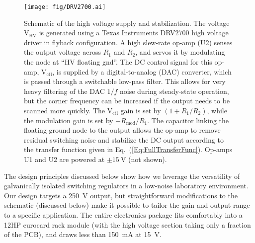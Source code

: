 \documentclass[aip,rsi,reprint]{revtex4-1} %
\begin{document}
\begin{figure}[t]
\texttt{[image: fig/DRV2700.ai]}
\caption{Schematic of the high voltage supply and stabilization.
The voltage $\text{V}_\text{HV}$ is generated using a Texas Instruments DRV2700 high voltage driver in flyback configuration.
A high slew-rate op-amp (U2) senses the output voltage across $R_1$ and $R_2$, and servos it by modulating the node at ``HV floating gnd''.
The DC control signal for this op-amp,  $\text{V}_{\text{ctl}}$, is supplied by a digital-to-analog (DAC) converter, which is passed through a switchable low-pass filter. This allows for very heavy filtering of the DAC $1/f$ noise during steady-state operation, but the corner frequency can be increased if the output needs to be scanned more quickly.
The $\text{V}_{\text{ctl}}$ gain is set by $\left(1+R_1/R_2\right)$, while the modulation gain is set by $-R_{\text{mod}}/R_1$.
The capacitor linking the floating ground node to the output allows the op-amp to remove residual switching noise and stabilize the DC output according to the transfer function given in Eq.~(\ref{Eq:FullTransferFunc}).
Op-amps U1 and U2 are powered at $\pm\SI{15}{\volt}$ (not shown).
\label{Fig:PiezoCircuit}}
\end{figure}

The design principles discussed below show how we leverage the versatility of galvanically isolated switching regulators in a low-noise laboratory environment. 
Our design targets a \SI{250}{\volt} output, but straightforward modifications to the schematic (discussed below) make it possible to tailor the gain and output range to a specific application.
The entire electronics package fits comfortably into a 12HP eurocard rack module (with the high voltage section taking only a fraction of the PCB), and draws less than \SI{150}{\milli\ampere} at \SI{15}{\volt}.
\end{document}
